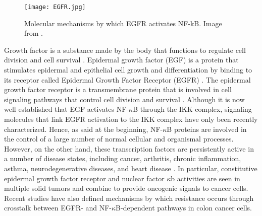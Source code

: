 \documentclass[12pt,a4paper]{report}
\begin{document}
\begin{figure}[ht]
\texttt{[image: EGFR.jpg]}
\caption{Molecular mechanisms by which EGFR activates NF-kB. Image from \cite{EGFRNFkB}.}
\label{NFkBEGFR}
\end{figure}
Growth factor is a substance made by the body that functions to regulate cell division and cell survival \cite{GF}. Epidermal growth factor (EGF) is a protein that stimulates epidermal and epithelial cell growth and differentiation by binding to its receptor called Epidermal Growth Factor Receptor (EGFR) \cite{EGF}. The epidermal growth factor receptor is a transmembrane protein that is involved in cell signaling pathways that control cell division and survival \cite{EGFR}. Although it is now well established that EGF activates NF-$\kappa$B through the IKK complex, signaling molecules that link EGFR activation to the IKK complex have only been recently characterized.
\newpage
Hence, as said at the beginning, NF-$\kappa$B proteins are involved in the control of a large number of normal cellular and organismal processes. However, on the other hand, these transcription factors are persistently active in a number of disease states, including cancer, arthritis, chronic inflammation, asthma, neurodegenerative diseases, and heart disease \cite{NFkB}. In particular, constitutive epidermal growth factor receptor and nuclear factor $\kappa$b activities are seen in multiple solid tumors and combine to provide oncogenic signals to cancer cells. Recent studies have also defined mechanisms by which resistance occurs through crosstalk between EGFR- and NF-$\kappa$B-dependent pathways in colon cancer cells.


\end{document}
